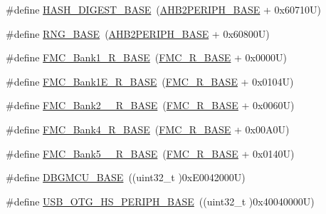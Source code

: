 \begin{DoxyCompactItemize}
\item 
\#define \hyperlink{group___peripheral__memory__map_ga41efdf0e6db11dad3003d01882ee8bcb}{H\+A\+S\+H\+\_\+\+D\+I\+G\+E\+S\+T\+\_\+\+B\+A\+SE}~(\hyperlink{group___peripheral__memory__map_gaeedaa71d22a1948492365e2cd26cfd46}{A\+H\+B2\+P\+E\+R\+I\+P\+H\+\_\+\+B\+A\+SE} + 0x60710\+U)
\item 
\#define \hyperlink{group___peripheral__memory__map_gab92662976cfe62457141e5b4f83d541c}{R\+N\+G\+\_\+\+B\+A\+SE}~(\hyperlink{group___peripheral__memory__map_gaeedaa71d22a1948492365e2cd26cfd46}{A\+H\+B2\+P\+E\+R\+I\+P\+H\+\_\+\+B\+A\+SE} + 0x60800\+U)
\item 
\#define \hyperlink{group___peripheral__memory__map_ga1d581e6f64ed2e5d97c11c58285a21b6}{F\+M\+C\+\_\+\+Bank1\+\_\+\+R\+\_\+\+B\+A\+SE}~(\hyperlink{group___peripheral__memory__map_ga7a599164cd92798542bc6288793d1ed5}{F\+M\+C\+\_\+\+R\+\_\+\+B\+A\+SE} + 0x0000\+U)
\item 
\#define \hyperlink{group___peripheral__memory__map_gad82d3a6bac014fa645fb67a63fae4bc0}{F\+M\+C\+\_\+\+Bank1\+E\+\_\+\+R\+\_\+\+B\+A\+SE}~(\hyperlink{group___peripheral__memory__map_ga7a599164cd92798542bc6288793d1ed5}{F\+M\+C\+\_\+\+R\+\_\+\+B\+A\+SE} + 0x0104\+U)
\item 
\#define \hyperlink{group___peripheral__memory__map_ga48c2af45e9b49fa719236a2e71d2f8b2}{F\+M\+C\+\_\+\+Bank2\+\_\+\_\+\+R\+\_\+\+B\+A\+SE}~(\hyperlink{group___peripheral__memory__map_ga7a599164cd92798542bc6288793d1ed5}{F\+M\+C\+\_\+\+R\+\_\+\+B\+A\+SE} + 0x0060\+U)
\item 
\#define \hyperlink{group___peripheral__memory__map_gadca715802374c00fafb6b4eb3e4d9a91}{F\+M\+C\+\_\+\+Bank4\+\_\+\+R\+\_\+\+B\+A\+SE}~(\hyperlink{group___peripheral__memory__map_ga7a599164cd92798542bc6288793d1ed5}{F\+M\+C\+\_\+\+R\+\_\+\+B\+A\+SE} + 0x00\+A0\+U)
\item 
\#define \hyperlink{group___peripheral__memory__map_gace117149a4fc0d07c38cc997fe4c4a73}{F\+M\+C\+\_\+\+Bank5\+\_\+\_\+\+R\+\_\+\+B\+A\+SE}~(\hyperlink{group___peripheral__memory__map_ga7a599164cd92798542bc6288793d1ed5}{F\+M\+C\+\_\+\+R\+\_\+\+B\+A\+SE} + 0x0140\+U)
\item 
\#define \hyperlink{group___peripheral__memory__map_ga4adaf4fd82ccc3a538f1f27a70cdbbef}{D\+B\+G\+M\+C\+U\+\_\+\+B\+A\+SE}~((uint32\+\_\+t )0x\+E0042000\+U)
\item 
\#define \hyperlink{group___peripheral__memory__map_gaa405d2ebfd7e9394237b6639f16a5409}{U\+S\+B\+\_\+\+O\+T\+G\+\_\+\+H\+S\+\_\+\+P\+E\+R\+I\+P\+H\+\_\+\+B\+A\+SE}~((uint32\+\_\+t )0x40040000\+U)

\end{DoxyCompactItemize}
